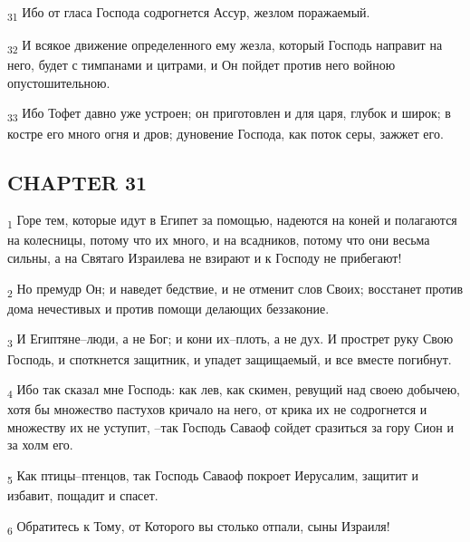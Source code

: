 \begin{tcolorbox}
\textsubscript{31} Ибо от гласа Господа содрогнется Ассур, жезлом поражаемый.
\end{tcolorbox}
\begin{tcolorbox}
\textsubscript{32} И всякое движение определенного ему жезла, который Господь направит на него, будет с тимпанами и цитрами, и Он пойдет против него войною опустошительною.
\end{tcolorbox}
\begin{tcolorbox}
\textsubscript{33} Ибо Тофет давно уже устроен; он приготовлен и для царя, глубок и широк; в костре его много огня и дров; дуновение Господа, как поток серы, зажжет его.
\end{tcolorbox}
\subsection{CHAPTER 31}
\begin{tcolorbox}
\textsubscript{1} Горе тем, которые идут в Египет за помощью, надеются на коней и полагаются на колесницы, потому что их много, и на всадников, потому что они весьма сильны, а на Святаго Израилева не взирают и к Господу не прибегают!
\end{tcolorbox}
\begin{tcolorbox}
\textsubscript{2} Но премудр Он; и наведет бедствие, и не отменит слов Своих; восстанет против дома нечестивых и против помощи делающих беззаконие.
\end{tcolorbox}
\begin{tcolorbox}
\textsubscript{3} И Египтяне--люди, а не Бог; и кони их--плоть, а не дух. И прострет руку Свою Господь, и споткнется защитник, и упадет защищаемый, и все вместе погибнут.
\end{tcolorbox}
\begin{tcolorbox}
\textsubscript{4} Ибо так сказал мне Господь: как лев, как скимен, ревущий над своею добычею, хотя бы множество пастухов кричало на него, от крика их не содрогнется и множеству их не уступит, --так Господь Саваоф сойдет сразиться за гору Сион и за холм его.
\end{tcolorbox}
\begin{tcolorbox}
\textsubscript{5} Как птицы--птенцов, так Господь Саваоф покроет Иерусалим, защитит и избавит, пощадит и спасет.
\end{tcolorbox}
\begin{tcolorbox}
\textsubscript{6} Обратитесь к Тому, от Которого вы столько отпали, сыны Израиля!
\end{tcolorbox}

